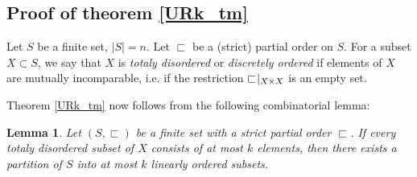 \documentclass[a4paper, 10pt,oneside]{amsart}
\newtheorem{lm}[tm]{Lemma}
\begin{document}
\subsection{Proof of theorem \ref{URk_tm}}

Let $S$ be a finite set, $|S|=n$. Let $\sqsubset$ be a (strict)
partial order on $S$. For a subset $X\subset S$, we say that
$X$ is \emph{totaly disordered}  or \emph{discretely ordered} if elements
of $X$ are mutually incomparable, i.e. if the restriction
$\sqsubset\hspace{-.5ex}|_{X\times X}$ is an empty set.

Theorem \ref{URk_tm} now follows from the following combinatorial lemma:

\begin{lm}
Let $(S,\sqsubset)$ be a finite set with a strict partial order $\sqsubset$.
If every totaly disordered subset of $X$ consists of at most $k$ elements, then
there exists a partition of $S$ into at most $k$ linearly ordered subsets.
\end{lm}
\end{document}
